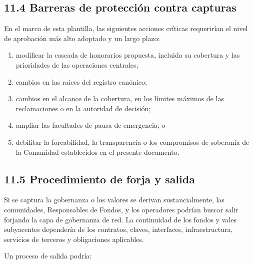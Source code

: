 \documentclass[11pt]{article}
\begin{document}
\subsection*{11.4 Barreras de protección contra capturas}

En el marco de esta plantilla, las siguientes acciones críticas requerirían el nivel de aprobación más alto adoptado y un largo plazo:

\begin{enumerate}[leftmargin=*]
\item modificar la cascada de honorarios propuesta, incluida su cobertura y las prioridades de las operaciones centrales;
\item cambios en las raíces del registro canónico;
\item cambios en el alcance de la cobertura, en los límites máximos de las reclamaciones o en la autoridad de decisión;
\item ampliar las facultades de pausa de emergencia; o
\item debilitar la forcabilidad, la transparencia o los compromisos de soberanía de la Comunidad establecidos en el presente documento.
\end{enumerate}
\subsection*{11.5 Procedimiento de forja y salida}

Si se captura la gobernanza o los valores se derivan sustancialmente, las comunidades, Responsables de Fondos, y los operadores podrían buscar salir forjando la capa de gobernanza de red. La continuidad de los fondos y vales subyacentes dependería de los contratos, claves, interfaces, infraestructura, servicios de terceros y obligaciones aplicables.

Un proceso de salida podría:
\end{document}
